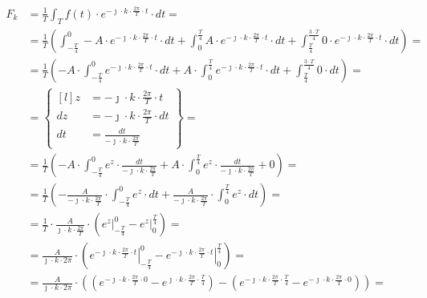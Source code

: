\begin{task}
\begin{align*}
F_k&=\frac{1}{T}\int_{T}f(t) \cdot e^{-\jmath \cdot k \cdot \frac{2\pi}{T} \cdot t} \cdot dt=\\
&=\frac{1}{T}\left(\int_{-\frac{T}{4}}^{0} -A \cdot e^{-\jmath \cdot k \cdot \frac{2\pi}{T} \cdot t} \cdot dt 
+ \int_{0}^{\frac{T}{4}} A \cdot e^{-\jmath \cdot k \cdot \frac{2\pi}{T} \cdot t} \cdot dt
+ \int_{\frac{T}{4}}^{\frac{3\cdot T}{4}} 0 \cdot e^{-\jmath \cdot k \cdot \frac{2\pi}{T} \cdot t} \cdot dt \right)=\\
&=\frac{1}{T}\left(-A \cdot \int_{-\frac{T}{4}}^{0} e^{-\jmath \cdot k \cdot \frac{2\pi}{T} \cdot t} \cdot dt 
+ A \cdot \int_{0}^{\frac{T}{4}} e^{-\jmath \cdot k \cdot \frac{2\pi}{T} \cdot t} \cdot dt
+ \int_{\frac{T}{4}}^{\frac{3\cdot T}{4}} 0 \cdot dt \right)=\\
&=\begin{Bmatrix*}[l]
z&=-\jmath \cdot k \cdot \frac{2\pi}{T} \cdot t \\
dz&=-\jmath \cdot k \cdot \frac{2\pi}{T} \cdot dt \\
dt&=\frac{dt}{-\jmath \cdot k \cdot \frac{2\pi}{T}}
\end{Bmatrix*} =\\
&=\frac{1}{T}\left(-A \cdot \int_{-\frac{T}{4}}^{0} e^{ z } \cdot \frac{dt}{-\jmath \cdot k \cdot \frac{2\pi}{T}} 
+ A \cdot \int_{0}^{\frac{T}{4}} e^{ z } \cdot \frac{dt}{-\jmath 
 \cdot k \cdot \frac{2\pi}{T}}
+ 0 \right)=\\
&=\frac{1}{T}\left(-\frac{A}{-\jmath \cdot k \cdot \frac{2\pi}{T}} \cdot \int_{-\frac{T}{4}}^{0} e^{ z } \cdot dt 
+ \frac{A}{-\jmath \cdot k \cdot \frac{2\pi}{T}} \cdot \int_{0}^{\frac{T}{4}} e^{ z } \cdot dt\right)=\\
&=\frac{1}{T} \cdot \frac{A}{\jmath \cdot k \cdot \frac{2\pi}{T}} \cdot \left( \left. e^{ z } \right|_{-\frac{T}{4}}^{0}
- \left. e^{ z }\right|_{0}^{\frac{T}{4}} \right)=\\
&=\frac{A}{\jmath \cdot k \cdot 2\pi} \cdot \left( \left. e^{ -\jmath \cdot k \cdot \frac{2\pi}{T} \cdot t  } \right|_{-\frac{T}{4}}^{0}
- \left. e^{ -\jmath \cdot k \cdot \frac{2\pi}{T} \cdot t  }\right|_{0}^{\frac{T}{4}} \right)=\\
&=\frac{A}{\jmath \cdot k \cdot 2\pi} \cdot \left(\left( e^{ -\jmath \cdot k \cdot \frac{2\pi}{T} \cdot 0  } - e^{ \jmath \cdot  k \cdot \frac{2\pi}{T} \cdot \frac{T}{4}  } \right)
- \left( e^{ -\jmath \cdot k \cdot \frac{2\pi}{T} \cdot \frac{T}{4}  } - e^{ -\jmath \cdot k \cdot \frac{2\pi}{T} \cdot 0  }\right) \right)=\\

\end{align*}
\end{task}
